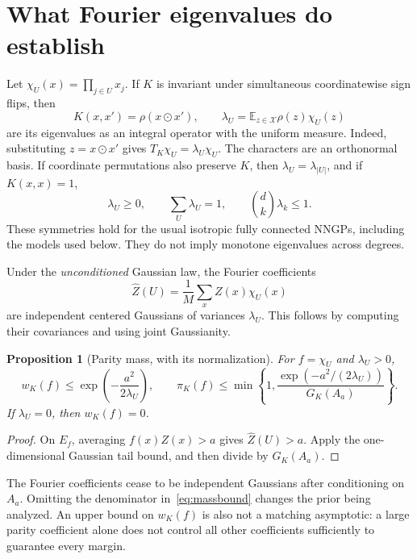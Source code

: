 \documentclass[11pt]{article}
\newtheorem{proposition}[theorem]{Proposition}
\theoremstyle{remark}\newtheorem{remark}[theorem]{Remark}
\newcommand{\E}{\mathbb E}
\newcommand{\X}{\mathcal X}
\begin{document}
\section{What Fourier eigenvalues do establish}\label{sec:fourier}
Let $\chi_U(x)=\prod_{j\in U}x_j$. If $K$ is invariant under simultaneous coordinatewise sign flips, then
\[
 K(x,x')=\rho(x\odot x'),\qquad
 \lambda_U=\E_{z\in\X}\rho(z)\chi_U(z)
\]
are its eigenvalues as an integral operator with the uniform measure. Indeed, substituting $z=x\odot x'$ gives $T_K\chi_U=\lambda_U\chi_U$. The characters are an orthonormal basis. If coordinate permutations also preserve $K$, then $\lambda_U=\lambda_{|U|}$, and if $K(x,x)=1$,
\begin{equation}\label{eq:trace}
 \lambda_U\ge0,\qquad \sum_U\lambda_U=1,
 \qquad \binom dk\lambda_k\le1.
\end{equation}
These symmetries hold for the usual isotropic fully connected NNGPs, including the models used below. They do not imply monotone eigenvalues across degrees.

Under the \emph{unconditioned} Gaussian law, the Fourier coefficients
\[
 \widehat Z(U)=\frac1M\sum_x Z(x)\chi_U(x)
\]
are independent centered Gaussians of variances $\lambda_U$. This follows by computing their covariances and using joint Gaussianity.

\begin{proposition}[Parity mass, with its normalization]\label{prop:mass}
For $f=\chi_U$ and $\lambda_U>0$,
\begin{equation}\label{eq:massbound}
 w_K(f)\le \exp\!\left(-\frac{a^2}{2\lambda_U}\right),
 \qquad
 \pi_K(f)\le
 \min\left\{1,\frac{\exp(-a^2/(2\lambda_U))}{G_K(A_a)}\right\}.
\end{equation}
If $\lambda_U=0$, then $w_K(f)=0$.
\end{proposition}
\begin{proof}
On $E_f$, averaging $f(x)Z(x)>a$ gives $\widehat Z(U)>a$. Apply the one-dimensional Gaussian tail bound, and then divide by $G_K(A_a)$.
\end{proof}
The Fourier coefficients cease to be independent Gaussians after conditioning on $A_a$. Omitting the denominator in~\eqref{eq:massbound} changes the prior being analyzed. An upper bound on $w_K(f)$ is also not a matching asymptotic: a large parity coefficient alone does not control all other coefficients sufficiently to guarantee every margin.
\end{document}
